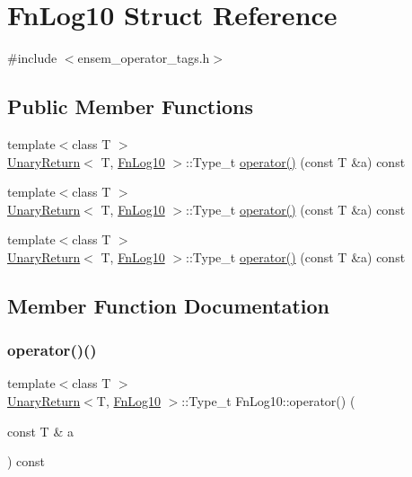 \hypertarget{structFnLog10}{}\section{Fn\+Log10 Struct Reference}
\label{structFnLog10}


{\ttfamily \#include $<$ensem\+\_\+operator\+\_\+tags.\+h$>$}

\subsection*{Public Member Functions}
\begin{DoxyCompactItemize}
\item 
{\footnotesize template$<$class T $>$ }\\\mbox{\hyperlink{structUnaryReturn}{Unary\+Return}}$<$ T, \mbox{\hyperlink{structFnLog10}{Fn\+Log10}} $>$\+::Type\+\_\+t \mbox{\hyperlink{structFnLog10_a1548f8a24a8e8897062608f1825e0c11}{operator()}} (const T \&a) const
\item 
{\footnotesize template$<$class T $>$ }\\\mbox{\hyperlink{structUnaryReturn}{Unary\+Return}}$<$ T, \mbox{\hyperlink{structFnLog10}{Fn\+Log10}} $>$\+::Type\+\_\+t \mbox{\hyperlink{structFnLog10_a1548f8a24a8e8897062608f1825e0c11}{operator()}} (const T \&a) const
\item 
{\footnotesize template$<$class T $>$ }\\\mbox{\hyperlink{structUnaryReturn}{Unary\+Return}}$<$ T, \mbox{\hyperlink{structFnLog10}{Fn\+Log10}} $>$\+::Type\+\_\+t \mbox{\hyperlink{structFnLog10_a1548f8a24a8e8897062608f1825e0c11}{operator()}} (const T \&a) const
\end{DoxyCompactItemize}


\subsection{Member Function Documentation}
\mbox{\label{structFnLog10_a1548f8a24a8e8897062608f1825e0c11}} 
\subsubsection{\texorpdfstring{operator()()}{operator()()}\hspace{0.1cm}{\footnotesize\ttfamily [1/3]}}
{\footnotesize\ttfamily template$<$class T $>$ \\
\mbox{\hyperlink{structUnaryReturn}{Unary\+Return}}$<$T, \mbox{\hyperlink{structFnLog10}{Fn\+Log10}} $>$\+::Type\+\_\+t Fn\+Log10\+::operator() (\begin{DoxyParamCaption}\item[{const T \&}]{a }\end{DoxyParamCaption}) const\hspace{0.3cm}{\ttfamily [inline]}}

